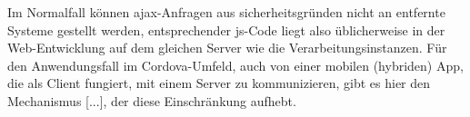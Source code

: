 






Im Normalfall können ajax-Anfragen aus sicherheitsgründen nicht an entfernte Systeme gestellt werden, entsprechender \gls{js}-Code liegt also üblicherweise in der Web-Entwicklung auf dem gleichen Server wie die Verarbeitungsinstanzen. 
Für den Anwendungsfall im Cordova-Umfeld, auch von einer mobilen (hybriden) App, die als Client fungiert, mit einem Server zu kommunizieren, gibt es hier den Mechanismus [...], der diese Einschränkung aufhebt. %





















